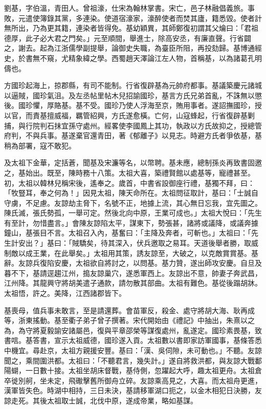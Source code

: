 
\begin{pinyinscope}
劉基，字伯溫，青田人。曾祖濠，仕宋為翰林掌書。宋亡，邑子林融倡義旅。事敗，元遣使簿錄其黨，多連染。使道宿濠家，濠醉使者而焚其廬，籍悉毀。使者計無所出，乃為更其籍，連染者皆得免。基幼穎異，其師鄭復初謂其父爚曰：「君祖德厚，此子必大君之門矣。」元至順間，舉進士，除高安丞，有廉直聲。行省闢之，謝去。起為江浙儒學副提舉，論御史失職，為臺臣所阻，再投劾歸。基博通經史，於書無不窺，尤精象緯之學。西蜀趙天澤論江左人物，首稱基，以為諸葛孔明儔也。

方國珍起海上，掠郡縣，有司不能制。行省復辟基為元帥府都事。基議築慶元諸城以逼賊，國珍氣沮。及左丞帖里帖木兒招諭國珍，基言方氏兄弟首亂，不誅無以懲後。國珍懼，厚賂基。基不受。國珍乃使人浮海至京，賄用事者。遂詔撫國珍，授以官，而責基擅威福，羈管紹興，方氏遂愈橫。亡何，山寇蜂起，行省復辟基剿捕，與行院判石抹宜孫守處州。經畧使李國鳳上其功，執政以方氏故抑之，授總管府判，不與兵事。基遂棄官還青田，著《郁離子》以見志。時避方氏者爭依基，基稍為部署，寇不敢犯。

及太祖下金華，定括蒼，聞基及宋濂等名，以幣聘。基未應，總制孫炎再致書固邀之，基始出。既至，陳時務十八策。太祖大喜，築禮賢館以處基等，寵禮甚至。初，太祖以韓林兒稱宋後，遙奉之。歲首，中書省設御座行禮，基獨不拜，曰：「牧豎耳，奉之何為！」因見太祖，陳天命所在。太祖問征取計，基曰：「士誠自守虜，不足慮。友諒劫主脅下，名號不正，地據上流，其心無日忘我，宜先圖之。陳氏滅，張氏勢孤，一舉可定。然後北向中原，王業可成也。」太祖大悅曰：「先生有至計，勿惜盡言。」會陳友諒陷太平，謀東下，勢張甚，諸將或議降，或議奔據鐘山，基張目不言。太祖召入內，基奮曰：「主降及奔者，可斬也。」太祖曰：「先生計安出？」基曰：「賊驕矣，待其深入，伏兵邀取之易耳。天道後舉者勝，取威制敵以成王業，在此舉矣。」太祖用其策，誘友諒至，大破之，以克敵賞賞基。基辭。友諒兵復陷安慶，太祖欲自將討之，以問基。基力贊，遂出師攻安慶。自旦及暮不下，基請逕趨江州，搗友諒巢穴，遂悉軍西上。友諒出不意，帥妻子奔武昌，江州降。其龍興守將胡美遣子通款，請勿散其部曲。太祖有難色。基從後蹋胡牀。太祖悟，許之。美降，江西諸郡皆下。

基喪母，值兵事未敢言，至是請還葬。會苗軍反，殺金、處守將胡大海、耿再成等，浙東搖動。基至衢子弟子曾子撰著。宋代開始由《禮記》中抽出，朱熹以之為，為守將夏毅諭安諸屬邑，復與平章邵榮等謀復處州，亂遂定。國珍素畏基，致書唁。基答書，宣示太祖威德，國珍遂入貢。太祖數以書即家訪軍國事，基條答悉中機宜。尋赴京，太祖方親援安豐。基曰：「漢、吳伺隙，未可動也。」不聽。友諒聞之，乘間圍洪都。太祖曰：「不聽君言，幾失計。」遂自將救洪都，與友諒大戰鄱陽蝴，一日數十接。太祖坐胡床督戰，基侍側，忽躍起大呼，趣太祖更舟。太祖倉卒徙別舸，坐未定，飛礮擊舊所御舟立碎。友諒乘高見之，大喜。而太祖舟更進，漢軍皆失色。時湖中相持，三日未決，基請移軍湖口扼之，以金木相犯日決勝，友諒走死。其後太祖取士誠，北伐中原，遂成帝業，略如基謀。


\end{pinyinscope}
